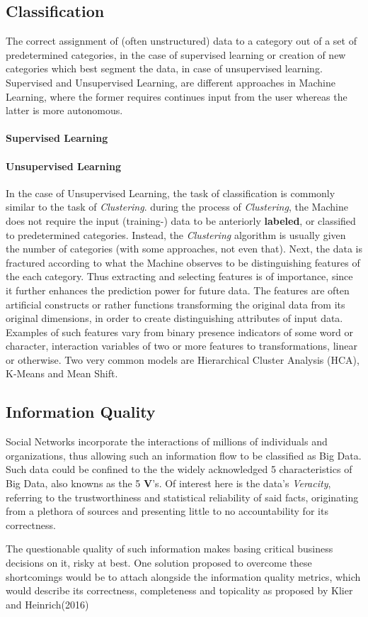 	\subsection{Classification}
		The correct assignment of (often unstructured) data to a category out of a set of predetermined categories, in the case of supervised learning or creation of new categories which best segment the data, in case of unsupervised learning. Supervised and Unsupervised Learning, are different approaches in Machine Learning, where the former requires continues input from the user whereas the latter is more autonomous.
		
		\paragraph{Supervised Learning}
		
		\paragraph{Unsupervised Learning}
		In the case of Unsupervised Learning, the task of classification is commonly similar to the task of \textit{Clustering}. during the process of \textit{Clustering}, the Machine does not require the input (training-) data to be anteriorly \textbf{labeled}, or classified to predetermined categories. Instead, the \textit{Clustering} algorithm is usually given the number of categories (with some approaches, not even that). Next, the data is fractured according to what the Machine observes to be distinguishing features of the each category. Thus extracting and selecting features is of importance, since it further enhances the prediction power for future data. The features are often artificial constructs or rather functions transforming the original data from its original dimensions, in order to create distinguishing attributes of input data. Examples of such features vary from binary presence indicators of some word or character, interaction variables of two or more features to transformations, linear or otherwise. Two very common models are Hierarchical Cluster Analysis (HCA), K-Means and Mean Shift.
		
	\subsection{Information Quality}
		Social Networks incorporate the interactions of millions of individuals and organizations, thus allowing such an information flow to be classified as Big Data. Such data could be confined to the the widely acknowledged 5 characteristics of Big Data, also knowns as the 5 \textbf{V}'s\cite{bigdata}. Of interest here is the data's \textit{Veracity}, referring to the trustworthiness and statistical reliability of said facts, originating from a plethora of sources and presenting little to no accountability for its correctness. 
		\par
		The questionable quality of such information makes basing critical business decisions on it, risky at best. One solution proposed to overcome these shortcomings would be to attach alongside the information quality metrics, which would describe its correctness, completeness and topicality as proposed by Klier and Heinrich(2016)\cite{klier2016datenqualitat}